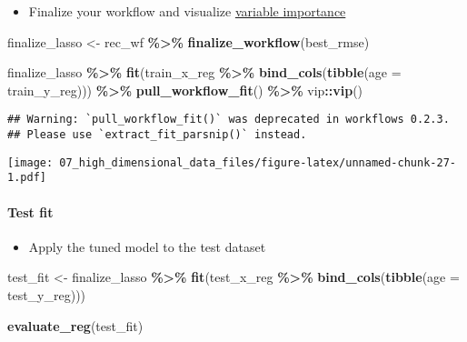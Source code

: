 \documentclass[
]{book}
\newenvironment{Shaded}{\begin{snugshade}}{\end{snugshade}}
\newcommand{\DataTypeTok}[1]{\textcolor[rgb]{0.13,0.29,0.53}{#1}}
\newcommand{\KeywordTok}[1]{\textcolor[rgb]{0.13,0.29,0.53}{\textbf{#1}}}
\newcommand{\NormalTok}[1]{#1}
\newcommand{\OperatorTok}[1]{\textcolor[rgb]{0.81,0.36,0.00}{\textbf{#1}}}
\newcommand{\StringTok}[1]{\textcolor[rgb]{0.31,0.60,0.02}{#1}}
\providecommand{\tightlist}{%
  \setlength{\itemsep}{0pt}\setlength{\parskip}{0pt}}
\begin{document}
\begin{itemize}
\tightlist
\item
  Finalize your workflow and visualize \href{https://koalaverse.github.io/vip/articles/vip.html}{variable importance}
\end{itemize}

\begin{Shaded}
\begin{Highlighting}[]
\NormalTok{finalize\_lasso \textless{}{-}}\StringTok{ }\NormalTok{rec\_wf }\OperatorTok{\%\textgreater{}\%}
\StringTok{  }\KeywordTok{finalize\_workflow}\NormalTok{(best\_rmse)}

\NormalTok{finalize\_lasso }\OperatorTok{\%\textgreater{}\%}
\StringTok{  }\KeywordTok{fit}\NormalTok{(train\_x\_reg }\OperatorTok{\%\textgreater{}\%}\StringTok{ }\KeywordTok{bind\_cols}\NormalTok{(}\KeywordTok{tibble}\NormalTok{(}\DataTypeTok{age =}\NormalTok{ train\_y\_reg))) }\OperatorTok{\%\textgreater{}\%}
\StringTok{  }\KeywordTok{pull\_workflow\_fit}\NormalTok{() }\OperatorTok{\%\textgreater{}\%}
\StringTok{  }\NormalTok{vip}\OperatorTok{::}\KeywordTok{vip}\NormalTok{()}
\end{Highlighting}
\end{Shaded}

\begin{verbatim}
## Warning: `pull_workflow_fit()` was deprecated in workflows 0.2.3.
## Please use `extract_fit_parsnip()` instead.
\end{verbatim}

\texttt{[image: 07\_high\_dimensional\_data\_files/figure-latex/unnamed-chunk-27-1.pdf]}

\hypertarget{test-fit}{%
\paragraph{Test fit}\label{test-fit}}

\begin{itemize}
\tightlist
\item
  Apply the tuned model to the test dataset
\end{itemize}

\begin{Shaded}
\begin{Highlighting}[]
\NormalTok{test\_fit \textless{}{-}}\StringTok{ }\NormalTok{finalize\_lasso }\OperatorTok{\%\textgreater{}\%}
\StringTok{  }\KeywordTok{fit}\NormalTok{(test\_x\_reg }\OperatorTok{\%\textgreater{}\%}\StringTok{ }\KeywordTok{bind\_cols}\NormalTok{(}\KeywordTok{tibble}\NormalTok{(}\DataTypeTok{age =}\NormalTok{ test\_y\_reg)))}

\KeywordTok{evaluate\_reg}\NormalTok{(test\_fit)}
\end{Highlighting}
\end{Shaded}
\end{document}
